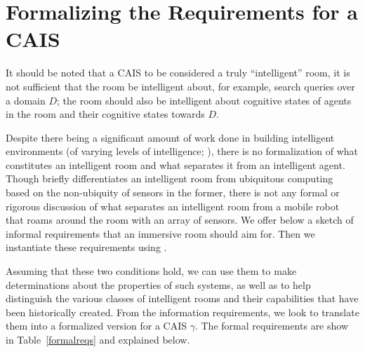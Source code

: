 \section{Formalizing the Requirements for a CAIS}

It should be noted that a CAIS to be considered a truly ``intelligent''
room, it is not sufficient that the room be intelligent about, for
example, search queries over a domain $D$; the room should also be
intelligent about cognitive states of agents in the room and their
cognitive states towards $D$.

Despite there being a significant amount of work done in building
intelligent environments (of varying levels of intelligence;
\cite{coen1998design, brooks1997intelligent,chan2008review}), there
is no formalization of what constitutes an intelligent room and what
separates it from an intelligent agent.  Though \cite{coen1998design}
briefly differentiates an intelligent room from ubiquitous computing
based on the non-ubiquity of sensors in the former, there is not any
formal or rigorous discussion of what separates an intelligent room
from a mobile robot that roams around the room with an array of
sensors.  We offer below a sketch of informal requirements that an
immersive room should aim for.  Then we instantiate these requirements
using \DCEC.

Assuming that these two conditions hold, we can use them to make determinations
about the properties of such systems, as well as to help distinguish the various
classes of intelligent rooms and their capabilities that have been historically created.
From the information requirements, we look to translate them into a formalized version
for a CAIS $\gamma$.  The formal requirements are show in Table~\ref{formalreqs} and
explained below.

